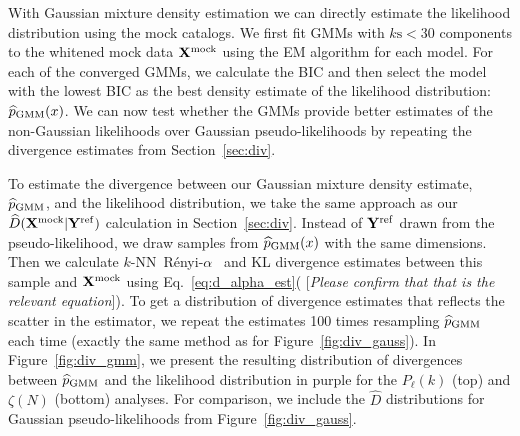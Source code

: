 \documentclass[12pt, letterpaper, preprint]{aastex}
\newcommand{\Nd}{{100}\xspace}
\newcommand{\Xmock}{{\bf X}^\mathrm{mock}}
\newcommand{\Yref}{{\bf Y}^\mathrm{ref}}
\newcommand{\Ralpha}{R\'enyi-$\alpha$}
\newcommand{\Beut}{\citetalias{beutler2017}\xspace}
\newcommand{\Sinh}{\citetalias{sinha2017}\xspace}
\newcommand{\ms}[1]{{\color{orange}{\bf MS:}} {[\em #1}]}
\newcommand{\gmms}{{\small{GMM}s}\xspace}
\newcommand{\EM}{{\small{EM}}\xspace}
\newcommand{\bic}{{\small{BIC}}\xspace}
\begin{document}
With Gaussian mixture density estimation we can directly estimate 
the likelihood distribution using the mock catalogs. We first fit 
\gmms with $k\mathrm{s} < 30$ components to the whitened 
mock data $\Xmock$ using the \EM algorithm for each model. For each of the 
converged \gmms, we calculate the \bic and then select the model with the 
lowest \bic as the best density estimate of the likelihood 
distribution: $\widehat{p}_\mathrm{\tiny GMM}(x)$. We can now test whether 
the \gmms provide better estimates of the non-Gaussian likelihoods over Gaussian
pseudo-likelihoods by repeating the divergence estimates from 
Section~\ref{sec:div}. 


To estimate the divergence between our Gaussian mixture density estimate,
$\widehat{p}_\mathrm{\tiny GMM}$, and the likelihood distribution, we take 
the same approach as our $\widehat{D}(\Xmock | \Yref)$ calculation in Section~\ref{sec:div}. 
Instead of $\Yref$ drawn from the pseudo-likelihood, we draw 
samples from $\widehat{p}_\mathrm{\tiny GMM}(x)$ with the same 
dimensions. Then we calculate $k$-NN~\Ralpha~
and KL divergence estimates between this sample and $\Xmock$ using
Eq.~\ref{eq:d_alpha_est}(\ms{Please confirm that that is the relevant equation}). To get a distribution of divergence
estimates that reflects the scatter in the estimator, we repeat the
estimates \Nd times resampling $\widehat{p}_\mathrm{\tiny GMM}$
each time (exactly the same method as for Figure~\ref{fig:div_gauss}). In Figure~\ref{fig:div_gmm}, 
we present the resulting distribution of divergences between 
$\widehat{p}_\mathrm{\tiny GMM}$ and the likelihood distribution in purple 
for the $P_\ell(k)$ (top) and $\zeta(N)$ (bottom) analyses. For comparison, 
we include the $\widehat{D}$ distributions for Gaussian pseudo-likelihoods from Figure~\ref{fig:div_gauss}. 
\end{document}
